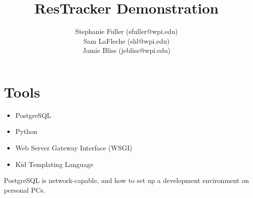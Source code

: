 \documentclass{article}
\title{ResTracker Demonstration}
\author{Stephanie Fuller (sfuller@wpi.edu)\\ Sam LaFleche (shl@wpi.edu)\\ Jamie
Bliss (jebliss@wpi.edu)}
\begin{document}
\maketitle

\section{Tools}
\begin{itemize}
\item PostgreSQL
\item Python
\item Web Server Gateway Interface (WSGI)
\item Kid Templating Language
\end{itemize}

PostgreSQL is network-capable, and how to set up a development environment on 
personal PCs.
\end{document}
